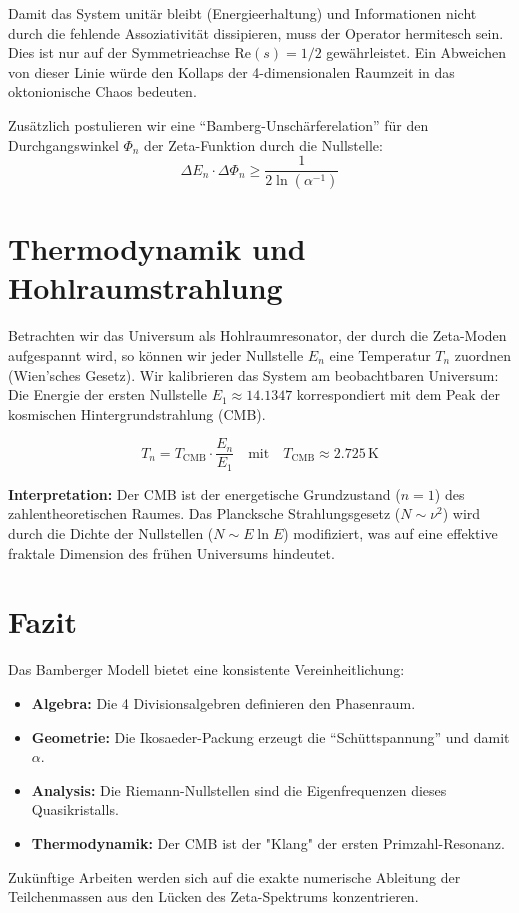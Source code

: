 \documentclass[11pt, a4paper]{article}
\begin{document}
	Damit das System unitär bleibt (Energieerhaltung) und Informationen nicht durch die fehlende Assoziativität dissipieren, muss der Operator hermitesch sein. Dies ist nur auf der Symmetrieachse $\text{Re}(s) = 1/2$ gewährleistet. Ein Abweichen von dieser Linie würde den Kollaps der 4-dimensionalen Raumzeit in das oktonionische Chaos bedeuten.
	
	Zusätzlich postulieren wir eine "`Bamberg-Unschärferelation"' für den Durchgangswinkel $\Phi_n$ der Zeta-Funktion durch die Nullstelle:
	\begin{equation}
		\Delta E_n \cdot \Delta \Phi_n \ge \frac{1}{2 \ln(\alpha^{-1})}
	\end{equation}
	
	\section{Thermodynamik und Hohlraumstrahlung}
	
	Betrachten wir das Universum als Hohlraumresonator, der durch die Zeta-Moden aufgespannt wird, so können wir jeder Nullstelle $E_n$ eine Temperatur $T_n$ zuordnen (Wien'sches Gesetz).
	Wir kalibrieren das System am beobachtbaren Universum: Die Energie der ersten Nullstelle $E_1 \approx 14.1347$ korrespondiert mit dem Peak der kosmischen Hintergrundstrahlung (CMB).
	
	\begin{equation}
		T_n = T_{\text{CMB}} \cdot \frac{E_n}{E_1} \quad \text{mit} \quad T_{\text{CMB}} \approx 2.725\, \text{K}
	\end{equation}
	
	\textbf{Interpretation:} Der CMB ist der energetische Grundzustand ($n=1$) des zahlentheoretischen Raumes. Das Plancksche Strahlungsgesetz ($N \sim \nu^2$) wird durch die Dichte der Nullstellen ($N \sim E \ln E$) modifiziert, was auf eine effektive fraktale Dimension des frühen Universums hindeutet.
	
	\section{Fazit}
	Das Bamberger Modell bietet eine konsistente Vereinheitlichung:
	\begin{itemize}
		\item \textbf{Algebra:} Die 4 Divisionsalgebren definieren den Phasenraum.
		\item \textbf{Geometrie:} Die Ikosaeder-Packung erzeugt die "`Schüttspannung"' und damit $\alpha$.
		\item \textbf{Analysis:} Die Riemann-Nullstellen sind die Eigenfrequenzen dieses Quasikristalls.
		\item \textbf{Thermodynamik:} Der CMB ist der "Klang" der ersten Primzahl-Resonanz.
	\end{itemize}
	Zukünftige Arbeiten werden sich auf die exakte numerische Ableitung der Teilchenmassen aus den Lücken des Zeta-Spektrums konzentrieren.
	
\end{document}
